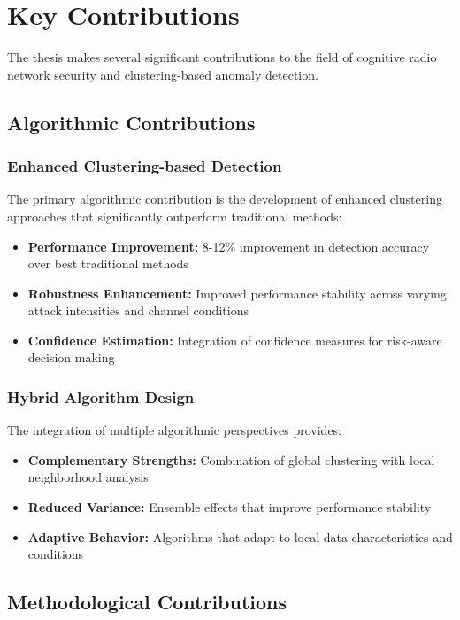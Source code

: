 \section{Key Contributions}
The thesis makes several significant contributions to the field of cognitive radio network security and clustering-based anomaly detection.

\subsection{Algorithmic Contributions}

\subsubsection{Enhanced Clustering-based Detection}
The primary algorithmic contribution is the development of enhanced clustering approaches that significantly outperform traditional methods:
\begin{itemize}
\item \textbf{Performance Improvement:} 8-12\% improvement in detection accuracy over best traditional methods
\item \textbf{Robustness Enhancement:} Improved performance stability across varying attack intensities and channel conditions
\item \textbf{Confidence Estimation:} Integration of confidence measures for risk-aware decision making
\end{itemize}

\subsubsection{Hybrid Algorithm Design}
The integration of multiple algorithmic perspectives provides:
\begin{itemize}
\item \textbf{Complementary Strengths:} Combination of global clustering with local neighborhood analysis
\item \textbf{Reduced Variance:} Ensemble effects that improve performance stability
\item \textbf{Adaptive Behavior:} Algorithms that adapt to local data characteristics and conditions
\end{itemize}

\subsection{Methodological Contributions}


